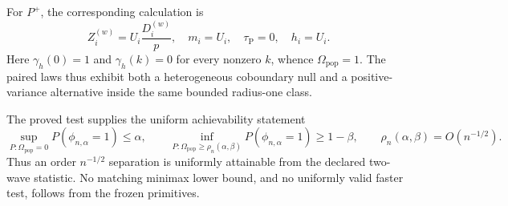 For \(P^+\), the corresponding calculation is
\[
 Z_i^{(w)}=U_i\frac{D_i^{(w)}}p,
 \quad m_i=U_i,\quad \tau_{\mathrm P}=0,\quad h_i=U_i.
\]
Here \(\gamma_h(0)=1\) and \(\gamma_h(k)=0\) for every nonzero \(k\), whence \(\Omega_{\mathrm{pop}}=1\).  The paired laws thus exhibit both a heterogeneous coboundary null and a positive-variance alternative inside the same bounded radius-one class.

The proved test supplies the uniform achievability statement
\[
 \sup_{P:\Omega_{\mathrm{pop}}=0}P(\phi_{n,\alpha}=1)\le\alpha,
 \qquad
 \inf_{P:\Omega_{\mathrm{pop}}\ge\rho_n(\alpha,\beta)}
 P(\phi_{n,\alpha}=1)\ge1-\beta,
 \qquad
 \rho_n(\alpha,\beta)=O(n^{-1/2}).
\]
Thus an order \(n^{-1/2}\) separation is uniformly attainable from the declared two-wave statistic.  No matching minimax lower bound, and no uniformly valid faster test, follows from the frozen primitives.
